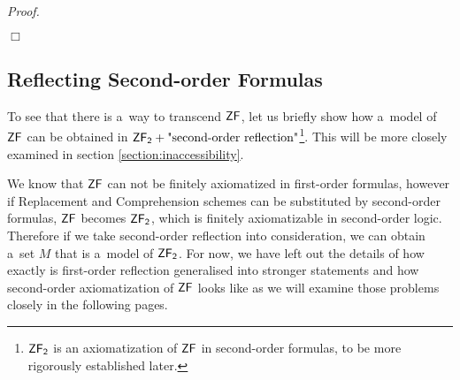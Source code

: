 \documentclass[12pt,a4paper]{article}
\newenvironment{proof}
{\noindent \textit{Proof.}}
{\hspace*{\fill} $\Box$}
\newcommand{\then}{\rightarrow}
\begin{document}
\begin{}
\begin{proof}

\end{proof}




\subsection{Reflecting Second-order Formulas}


To see that there is a~way to transcend $\sf{ZF}$, let us briefly show how a~model of $\sf{ZF}$ can be obtained in $\sf{ZF}_2 + \mbox{"second-order reflection"}$\footnote{$\sf{ZF}_2$ is an axiomatization of $\sf{ZF}$ in second-order formulas, to be more rigorously established later.}. This will be more closely examined in section \ref{section:inaccessibility}.

We know that $\sf{ZF}$ can not be finitely axiomatized in first-order formulas, however if Replacement and Comprehension schemes can be substituted by second-order formulas, $\sf{ZF}$ becomes $\sf{ZF}_2$, which is finitely axiomatizable in second-order logic. Therefore if we take second-order reflection into consideration, we can obtain a~set $M$ that is a~model of $\sf{ZF}_2$. For now, we have left out the details of how exactly is first-order reflection generalised into stronger statements and how second-order axiomatization of $\sf{ZF}$ looks like as we will examine those problems closely in the following pages. 


\end{}
\end{document}
